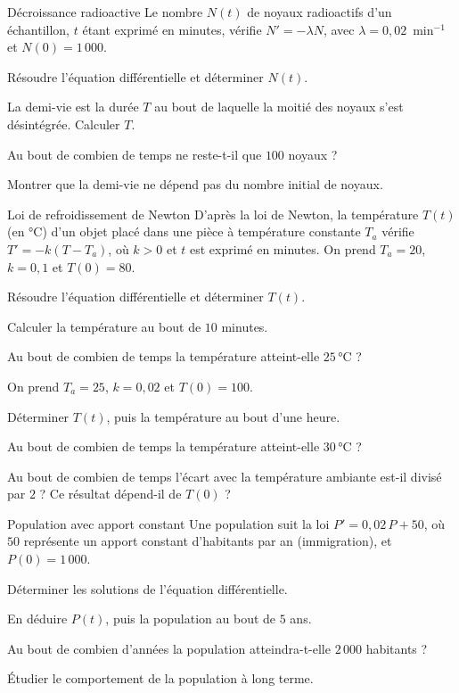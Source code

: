 \begin{exercice}[2]{Décroissance radioactive}
Le nombre $N(t)$ de noyaux radioactifs d'un échantillon, $t$ étant exprimé en minutes, vérifie $N'=-\lambda N$, avec
$\lambda=0{,}02$~min$^{-1}$ et $N(0)=1\,000$.
\begin{questions}
  \item Résoudre l'équation différentielle et déterminer $N(t)$.
  \item La demi-vie est la durée $T$ au bout de laquelle la moitié des noyaux s'est désintégrée. Calculer $T$.
  \item Au bout de combien de temps ne reste-t-il que $100$ noyaux ?
  \item Montrer que la demi-vie ne dépend pas du nombre initial de noyaux.
\end{questions}
\end{exercice}

\begin{exercice}[2]{Loi de refroidissement de Newton}
D'après la loi de Newton, la température $T(t)$ (en °C) d'un objet placé dans une pièce à température constante $T_a$ vérifie
$T'=-k\left(T-T_a\right)$, où $k>0$ et $t$ est exprimé en minutes.
On prend $T_a=20$, $k=0{,}1$ et $T(0)=80$.
\begin{questions}
  \item Résoudre l'équation différentielle et déterminer $T(t)$.
  \item Calculer la température au bout de $10$ minutes.
  \item Au bout de combien de temps la température atteint-elle $25$\,°C ?
\end{questions}
On prend $T_a=25$, $k=0{,}02$ et $T(0)=100$.
\begin{questions}[resume]
  \item Déterminer $T(t)$, puis la température au bout d'une heure.
  \item Au bout de combien de temps la température atteint-elle $30$\,°C ?
  \item Au bout de combien de temps l'écart avec la température ambiante est-il divisé par $2$ ? Ce résultat dépend-il de $T(0)$ ?
\end{questions}
\end{exercice}

\begin{exercice}[2]{Population avec apport constant}
Une population suit la loi $P'=0{,}02\,P+50$, où $50$ représente un apport constant d'habitants par an (immigration), et $P(0)=1\,000$.
\begin{questions}
  \item Déterminer les solutions de l'équation différentielle.
  \item En déduire $P(t)$, puis la population au bout de $5$ ans.
  \item Au bout de combien d'années la population atteindra-t-elle $2\,000$ habitants ?
  \item Étudier le comportement de la population à long terme.
\end{questions}
\end{exercice}

